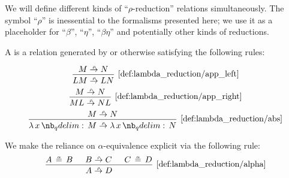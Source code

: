 \begin{definition}\label{def:lambda_reduction}
  We will define different kinds of \enquote{\( \rho \)-reduction} relations simultaneously. The symbol \enquote{\( \rho \)} is inessential to the formalisms presented here; we use it as a placeholder for \enquote{\( \beta \)}, \enquote{\( \eta \)}, \enquote{\( \beta\eta \)} and potentially other kinds of reductions.

  \begin{thmenum}
     A  is a relation generated by or otherwise satisfying the following rules:
    \begin{ThreeColumns}
      \begin{equation*}\taglabel[\ensuremath{ \logic{App}_\rho^L }]{def:lambda_reduction/app_left}
        \begin{prooftree}
          \hypo{ M \rred N }
          \infer1[\ref{def:lambda_reduction/app_left}]{ LM \rred LN }
        \end{prooftree}
      \end{equation*}
    \BeginSecondColumn
      \begin{equation*}\taglabel[\ensuremath{ \logic{App}_\rho^R }]{def:lambda_reduction/app_right}
        \begin{prooftree}
          \hypo{ M \rred N }
          \infer1[\ref{def:lambda_reduction/app_right}]{ ML \rred NL }
        \end{prooftree}
      \end{equation*}
    \BeginThirdColumn
      \begin{equation*}\taglabel[\ensuremath{ \logic{Abs}_\rho }]{def:lambda_reduction/abs}
        \begin{prooftree}
          \hypo{ M \rred N }
          \infer1[\ref{def:lambda_reduction/abs}]{ \qabs x M \rred \qabs x N }
        \end{prooftree}
      \end{equation*}
    \end{ThreeColumns}

    We make the reliance on \( \alpha \)-equivalence explicit via the following rule:
    \begin{equation*}\taglabel[\ensuremath{ \logic{Alpha}_\rho }]{def:lambda_reduction/alpha}
      \begin{prooftree}
        \hypo{ A \aequiv B }
        \hypo{ B \rred C }
        \hypo{ C \aequiv D }
        \infer3[\ref{def:lambda_reduction/alpha}]{ A \rred D }.
      \end{prooftree}
    \end{equation*}


\end{thmenum}
\end{definition}
